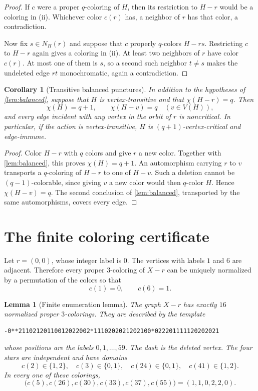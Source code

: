 \documentclass[10pt]{amsart}
\newtheorem{lemma}[theorem]{Lemma}
\newtheorem{corollary}[theorem]{Corollary}
\theoremstyle{definition}
\begin{document}
\begin{proof}
If $c$ were a proper $q$-coloring of $H$, then its restriction to $H-r$ would
be a coloring in (ii).  Whichever color $c(r)$ has, a neighbor of $r$ has that
color, a contradiction.

Now fix $s\in N_H(r)$ and suppose that $c$ properly $q$-colors $H-rs$.
Restricting $c$ to $H-r$ again gives a coloring in (ii).  At least two
neighbors of $r$ have color $c(r)$.  At most one of them is $s$, so a second
such neighbor $t\neq s$ makes the undeleted edge $rt$ monochromatic, again a
contradiction.
\end{proof}

\begin{corollary}[Transitive balanced punctures]\label{cor:transitive}
In addition to the hypotheses of \cref{lem:balanced}, suppose that $H$ is
vertex-transitive and that $\chi(H-r)=q$.  Then
\[
 \chi(H)=q+1,\qquad \chi(H-v)=q\quad(v\in V(H)),
\]
and every edge incident with any vertex in the orbit of $r$ is noncritical.
In particular, if the action is vertex-transitive, $H$ is
$(q+1)$-vertex-critical and edge-immune.
\end{corollary}

\begin{proof}
Color $H-r$ with $q$ colors and give $r$ a new color.  Together with
\cref{lem:balanced}, this proves $\chi(H)=q+1$.  An automorphism carrying $r$
to $v$ transports a $q$-coloring of $H-r$ to one of $H-v$.  Such a deletion
cannot be $(q-1)$-colorable, since giving $v$ a new color would then
$q$-color $H$.  Hence $\chi(H-v)=q$.  The second conclusion of
\cref{lem:balanced}, transported by the same automorphisms, covers every edge.
\end{proof}

\section{The finite coloring certificate}\label{sec:certificate}

Let $r=(0,0)$, whose integer label is $0$.  The vertices with labels $1$ and
$6$ are adjacent.  Therefore every proper $3$-coloring of $X-r$ can be
uniquely normalized by a permutation of the colors so that
\[
 c(1)=0,\qquad c(6)=1.
\]

\begin{lemma}[Finite enumeration lemma]\label{lem:finite}
The graph $X-r$ has exactly $16$ normalized proper $3$-colorings.  They are
described by the template
\begin{lstlisting}
-0**21102120110012022002*1110202021202100*022201111120202021
\end{lstlisting}
whose positions are the labels $0,1,\ldots,59$.  The dash is the deleted
vertex.  The four stars are independent and have domains
\[
 c(2)\in\{1,2\},\quad c(3)\in\{0,1\},\quad
 c(24)\in\{0,1\},\quad c(41)\in\{1,2\}.
\]
In every one of these colorings,
\begin{equation}\label{eq:neighbor-profile}
 \bigl(c(5),c(26),c(30),c(33),c(37),c(55)\bigr)
   =(1,1,0,2,2,0).
\end{equation}
\end{lemma}
\end{document}
